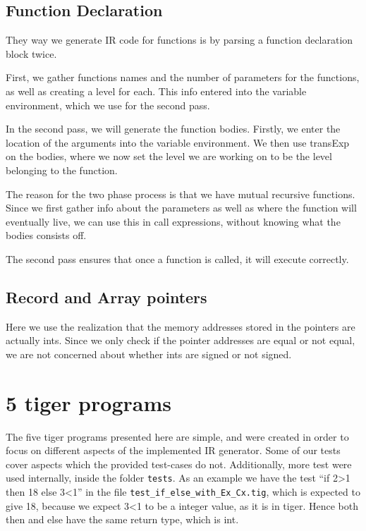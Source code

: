 \documentclass{article}
\begin{document}
\subsection{Function Declaration}
They way we generate IR code for functions is by parsing a function declaration block twice.

First, we gather functions names and the number of parameters for the functions, as well as creating a level for each. This info entered into the variable environment, which we use for the second pass.

In the second pass, we will generate the function bodies. Firstly, we enter the location of the arguments into the variable environment. We then use transExp on the bodies, where we now set the level we are working on to be the level belonging to the function.

The reason for the two phase process is that we have mutual recursive functions. Since we first gather info about the parameters as well as where the function will eventually live, we can use this in call expressions, without knowing what the bodies consists off.

The second pass ensures that once a function is called, it will execute correctly.

\subsection{Record and Array pointers}
Here we use the realization that the memory addresses stored in the pointers are actually ints. Since we only check if the pointer addresses are equal or not equal, we are not concerned about whether ints are signed or not signed.

\section{5 tiger programs}

The five tiger programs presented here are simple, and were created in order to focus on different aspects of the implemented IR generator. Some of our tests cover aspects which the provided test-cases do not. Additionally, more test were used internally, inside the folder \texttt{tests}. As an example we have the test ``if 2>1 then 18 else 3<1'' in the file \texttt{test_if_else_with_Ex_Cx.tig}, which is expected to give 18, because we expect 3<1 to be a integer value, as it is in tiger. Hence both then and else have the same return type, which is int.
\end{document}
